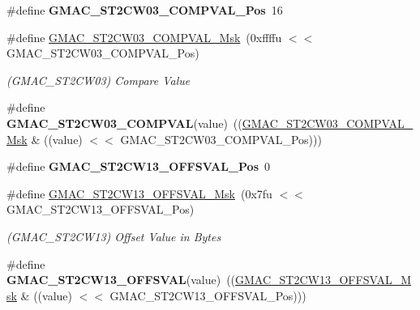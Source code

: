 \begin{DoxyCompactItemize}
\item 
\mbox{\label{group__SAMV71__GMAC_gac0bee466ac3f7f8bc4d583ba44f76a7f}} 
\#define {\bfseries G\+M\+A\+C\+\_\+\+S\+T2\+C\+W03\+\_\+\+C\+O\+M\+P\+V\+A\+L\+\_\+\+Pos}~16
\item 
\mbox{\label{group__SAMV71__GMAC_gabe7cf1cd012940de7c9c4ba36148dfe0}} 
\#define \mbox{\hyperlink{group__SAMV71__GMAC_gabe7cf1cd012940de7c9c4ba36148dfe0}{G\+M\+A\+C\+\_\+\+S\+T2\+C\+W03\+\_\+\+C\+O\+M\+P\+V\+A\+L\+\_\+\+Msk}}~(0xffffu $<$$<$ G\+M\+A\+C\+\_\+\+S\+T2\+C\+W03\+\_\+\+C\+O\+M\+P\+V\+A\+L\+\_\+\+Pos)
\begin{DoxyCompactList}\small\item\em (G\+M\+A\+C\+\_\+\+S\+T2\+C\+W03) Compare Value \end{DoxyCompactList}\item 
\mbox{\label{group__SAMV71__GMAC_gaefc0d7392441de4dd7ed820efebb0543}} 
\#define {\bfseries G\+M\+A\+C\+\_\+\+S\+T2\+C\+W03\+\_\+\+C\+O\+M\+P\+V\+AL}(value)~((\mbox{\hyperlink{group__SAMV71__GMAC_gabe7cf1cd012940de7c9c4ba36148dfe0}{G\+M\+A\+C\+\_\+\+S\+T2\+C\+W03\+\_\+\+C\+O\+M\+P\+V\+A\+L\+\_\+\+Msk}} \& ((value) $<$$<$ G\+M\+A\+C\+\_\+\+S\+T2\+C\+W03\+\_\+\+C\+O\+M\+P\+V\+A\+L\+\_\+\+Pos)))
\item 
\mbox{\label{group__SAMV71__GMAC_gaf5582ae848be29a485d7757e6b0a5d65}} 
\#define {\bfseries G\+M\+A\+C\+\_\+\+S\+T2\+C\+W13\+\_\+\+O\+F\+F\+S\+V\+A\+L\+\_\+\+Pos}~0
\item 
\mbox{\label{group__SAMV71__GMAC_ga89f03d469dad448436bedba4e7563463}} 
\#define \mbox{\hyperlink{group__SAMV71__GMAC_ga89f03d469dad448436bedba4e7563463}{G\+M\+A\+C\+\_\+\+S\+T2\+C\+W13\+\_\+\+O\+F\+F\+S\+V\+A\+L\+\_\+\+Msk}}~(0x7fu $<$$<$ G\+M\+A\+C\+\_\+\+S\+T2\+C\+W13\+\_\+\+O\+F\+F\+S\+V\+A\+L\+\_\+\+Pos)
\begin{DoxyCompactList}\small\item\em (G\+M\+A\+C\+\_\+\+S\+T2\+C\+W13) Offset Value in Bytes \end{DoxyCompactList}\item 
\mbox{\label{group__SAMV71__GMAC_ga806016a8dcfde9f6326e7631fcdc524f}} 
\#define {\bfseries G\+M\+A\+C\+\_\+\+S\+T2\+C\+W13\+\_\+\+O\+F\+F\+S\+V\+AL}(value)~((\mbox{\hyperlink{group__SAMV71__GMAC_ga89f03d469dad448436bedba4e7563463}{G\+M\+A\+C\+\_\+\+S\+T2\+C\+W13\+\_\+\+O\+F\+F\+S\+V\+A\+L\+\_\+\+Msk}} \& ((value) $<$$<$ G\+M\+A\+C\+\_\+\+S\+T2\+C\+W13\+\_\+\+O\+F\+F\+S\+V\+A\+L\+\_\+\+Pos)))

\end{DoxyCompactItemize}
